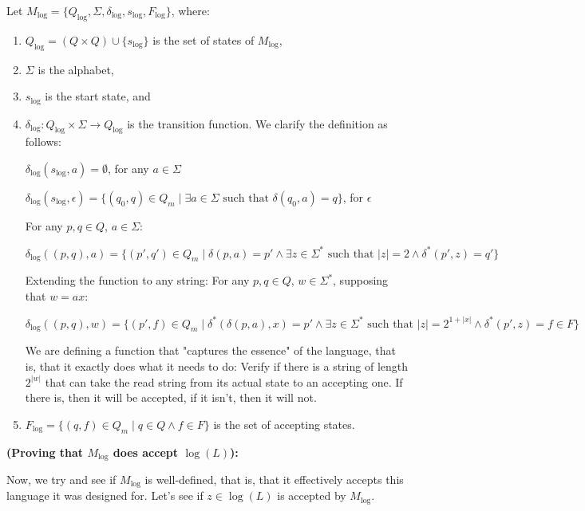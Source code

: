\documentclass[12pt]{article}
\begin{document}
Let $M_{\text{log}} = \{Q_{\text{log}}, \Sigma, \delta_{\text{log}}, s_{\text{log}}, F_{\text{log}}\}$, where:
\begin{enumerate}
    \item $Q_{\text{log}} = (Q \times Q) \cup \{s_{\text{log}}\}$ is the set of states of $M_{\text{log}}$,
    \item $\Sigma$ is the alphabet,
    \item $s_{\text{log}}$ is the start state, and
    \item $\delta_{\text{log}} : Q_{\text{log}} \times \Sigma \rightarrow Q_{\text{log}}$ is the transition function. We clarify the definition as follows:
    
    $\delta_{\text{log}} (s_{\text{log}}, a) = \emptyset$, for any $a \in \Sigma$
    
    $\delta_{\text{log}} (s_{\text{log}}, \epsilon) = \{(q_0, q) \in Q_m \mid \exists a \in \Sigma \text{ such that } \delta(q_0, a) = q\}$, for $\epsilon$
    
    For any $p, q \in Q$, $a \in \Sigma$:
    
    $\delta_{\text{log}} ((p, q), a) = \{(p', q') \in Q_m \mid \delta(p, a) = p' \land \exists z \in \Sigma^* \text{ such that } |z| = 2 \land \delta^*(p', z) = q'\}$
    
    Extending the function to any string: For any $p, q \in Q$, $w \in \Sigma^*$, supposing that $w = ax$:
    
    $\delta_{\text{log}} ((p, q), w) = \{(p', f) \in Q_m \mid \delta^*(\delta(p, a), x) = p' \land \exists z \in \Sigma^* \text{ such that } |z| = 2^{1+|x|} \land \delta^*(p', z) = f \in F\}$

    We are defining a function that "captures the essence" of the language, that is, that it exactly does what it needs to do: Verify if there is a string of length $2^|w|$ that can take the read string from its actual state to an accepting one. If there is, then it will be accepted, if it isn't, then it will not. 
    
    \item $F_{\text{log}} = \{(q, f) \in Q_m \mid q \in Q \land f \in F\}$ is the set of accepting states.
\end{enumerate}

\textbf{(Proving that $M_{\text{log}}$ does accept $\log(L)$):}

Now, we try and see if $M_{\text{log}}$ is well-defined, that is, that it effectively accepts this language it was designed for. Let's see if $z \in \log(L)$ is accepted by $M_{\text{log}}$.
\end{document}
